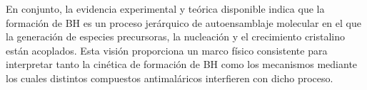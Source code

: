 \documentclass[12pt,letterpaper,oneside]{report}
\begin{document}


En conjunto, la evidencia experimental y teórica disponible indica que la formación de BH es un proceso jerárquico de autoensamblaje molecular en el que la generación de especies precursoras, la nucleación y el crecimiento cristalino están acoplados. Esta visión proporciona un marco físico consistente para interpretar tanto la cinética de formación de BH como los mecanismos mediante los cuales distintos compuestos antimaláricos interfieren con dicho proceso.\\


\end{document}
